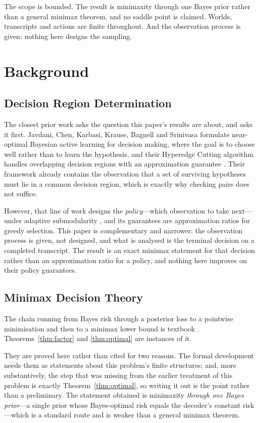 The scope is bounded. The result is minimaxity through one Bayes prior rather than a general
minimax theorem, and no saddle point is claimed. Worlds, transcripts and actions are finite
throughout. And the observation process is given: nothing here designs the sampling.

\section{Background}

\subsection{Decision Region Determination}

The closest prior work asks the question this paper's results are about, and asks it first.
Javdani, Chen,
Karbasi, Krause, Bagnell and Srinivasa formulate near-optimal Bayesian active learning for
decision making, where the goal is to choose well rather than to learn the hypothesis, and
their Hyperedge Cutting algorithm handles overlapping decision regions with an approximation
guarantee \cite{javdani2014}. Their framework already contains the observation that a set of
surviving hypotheses must lie in a common decision region, which is exactly why checking pairs
does not suffice.

However, that line of work designs the \emph{policy}---which observation to take next---under
adaptive submodularity \cite{golovin2011}, and its guarantees are approximation ratios for
greedy selection. This paper is complementary and narrower: the observation process is given,
not designed, and what is analysed is the terminal decision on a completed transcript. The
result is an exact minimax statement for that decision rather than an approximation ratio for
a policy, and nothing here improves on their policy guarantees.

\subsection{Minimax Decision Theory}

The chain running from Bayes risk through a posterior loss to a pointwise minimisation and
then to a minimax lower bound is textbook \cite{lehmann1998,wald1950}.
Theorems~\ref{thm:factor} and \ref{thm:optimal} are instances of it.

They are proved here rather than cited for two reasons. The formal development needs them as
statements about this problem's finite structures; and, more substantively, the step that was
missing from the earlier treatment of this problem is exactly
Theorem~\ref{thm:optimal}, so writing it out is the point rather than a preliminary. The
statement obtained is minimaxity \emph{through one Bayes prior}---a single prior whose
Bayes-optimal risk equals the decoder's constant risk---which is a standard route and is
weaker than a general minimax theorem.

